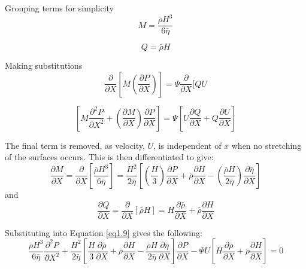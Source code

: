Grouping terms for simplicity
\begin{equation}\label{eq1.6}
	M=\frac{\bar{\rho} H^{3}}{6 \bar{\eta}}
\end{equation}

\begin{equation}\label{eq1.7}
	Q=\bar{\rho} H
\end{equation}

Making substitutions
\begin{equation}\label{eq1.8}
	\frac{\partial}{\partial X}\left[M\left(\frac{\partial P}{\partial X}\right)\right]=\Psi \frac{\partial}{\partial X}[Q U
\end{equation}

\begin{equation}\label{eq1.9}
	\left[M \frac{\partial^{2} P}{\partial X^{2}}+\left(\frac{\partial M}{\partial X}\right) \frac{\partial P}{\partial X}\right]=\Psi\left[U \frac{\partial Q}{\partial X}+Q \frac{\partial U}{\partial X}\right]
\end{equation}

The final term is removed, as velocity, $U$, is independent of $x$ when no stretching of the surfaces occurs. This is then differentiated to give:
\begin{equation}\label{eq1.10}
	\frac{\partial M}{\partial X}=\frac{\partial}{\partial X}\left[\frac{\bar{\rho} H^{3}}{6 \bar{\eta}}\right]=\frac{H^{2}}{2 \bar{\eta}}\left[\left(\frac{H}{3}\right) \frac{\partial P}{\partial X}+\bar{\rho} \frac{\partial H}{\partial X}-\left(\frac{\bar{\rho} H}{2 \bar{\eta}}\right) \frac{\partial \bar{\eta}}{\partial X}\right]
\end{equation}
and
\begin{equation}\label{eq1.11}
	\frac{\partial Q}{\partial X}=\frac{\partial}{\partial X}[\bar{\rho} H]=H \frac{\partial \bar{\rho}}{\partial X}+\bar{\rho} \frac{\partial H}{\partial X}
\end{equation}

Substituting into Equation \ref{eq1.9} gives the following:
\begin{equation}\label{eq1.12}
	\frac{\bar{\rho} H^{3}}{6 \bar{\eta}} \frac{\partial^{2} P}{\partial X^{2}}+\frac{H^{2}}{2 \bar{\eta}}\left[\frac{H}{3} \frac{\partial \bar{\rho}}{\partial X}+\bar{\rho} \frac{\partial H}{\partial X}-\frac{\bar{\rho} H}{2 \bar{\eta}} \frac{\partial \bar{\eta}}{\partial X}\right] \frac{\partial P}{\partial X}-\Psi U\left[H \frac{\partial \bar{\rho}}{\partial X}+\bar{\rho} \frac{\partial H}{\partial X}\right]=0
\end{equation}

